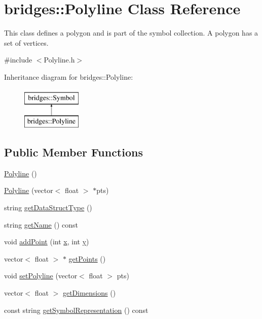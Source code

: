 \hypertarget{classbridges_1_1_polyline}{}\section{bridges\+::Polyline Class Reference}
\label{classbridges_1_1_polyline}


This class defines a polygon and is part of the symbol collection. A polygon has a set of vertices.  




{\ttfamily \#include $<$Polyline.\+h$>$}

Inheritance diagram for bridges\+::Polyline\+:\begin{figure}[H]
\begin{center}
\leavevmode
\includegraphics[height=2.000000cm]{classbridges_1_1_polyline}
\end{center}
\end{figure}
\subsection*{Public Member Functions}
\begin{DoxyCompactItemize}
\item 
\mbox{\hyperlink{classbridges_1_1_polyline_a34e2defd0e7e1a95bef282ff43ce478b}{Polyline}} ()
\item 
\mbox{\hyperlink{classbridges_1_1_polyline_a332ddf6a9136701ce2502ab5b2805d9c}{Polyline}} (vector$<$ float $>$ $\ast$pts)
\item 
string \mbox{\hyperlink{classbridges_1_1_polyline_a37e5e6648c889df79226f4f973457326}{get\+Data\+Struct\+Type}} ()
\item 
string \mbox{\hyperlink{classbridges_1_1_polyline_a829fe21ce52595ecb7473a4368b136d6}{get\+Name}} () const
\item 
void \mbox{\hyperlink{classbridges_1_1_polyline_a1f1d38171e5603ab6a17d714cb46add3}{add\+Point}} (int \mbox{\hyperlink{namespacebridges_acfb0a4f7877d8f63de3e6862004c50eda9dd4e461268c8034f5c8564e155c67a6}{x}}, int \mbox{\hyperlink{namespacebridges_acfb0a4f7877d8f63de3e6862004c50eda415290769594460e2e485922904f345d}{y}})
\item 
vector$<$ float $>$ $\ast$ \mbox{\hyperlink{classbridges_1_1_polyline_aab7bddeace9c9e9d5b296666dd9dede5}{get\+Points}} ()
\item 
void \mbox{\hyperlink{classbridges_1_1_polyline_adaae3e064c497291beb1ba3cacb4b9a0}{set\+Polyline}} (vector$<$ float $>$ pts)
\item 
vector$<$ float $>$ \mbox{\hyperlink{classbridges_1_1_polyline_aa0ce633fa1bb6460f507fe98026de443}{get\+Dimensions}} ()
\item 
const string \mbox{\hyperlink{classbridges_1_1_polyline_a850d2f619466b159c7874317f9eaf0a3}{get\+Symbol\+Representation}} () const
\end{DoxyCompactItemize}
